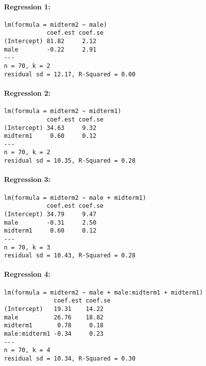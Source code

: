 \documentclass[addpoints,12pt]{exam}
\begin{document}
\begin{questions}
\begin{table}
\paragraph{Regression 1:}
\begin{verbatim}
lm(formula = midterm2 ~ male)
            coef.est coef.se
(Intercept) 81.82     2.12  
male        -0.22     2.91  
---
n = 70, k = 2
residual sd = 12.17, R-Squared = 0.00
	\end{verbatim}
	\paragraph{Regression 2:}
	\begin{verbatim}
lm(formula = midterm2 ~ midterm1)
            coef.est coef.se
(Intercept) 34.63     9.32  
midterm1     0.60     0.12  
---
n = 70, k = 2
residual sd = 10.35, R-Squared = 0.28
	\end{verbatim}
	\paragraph{Regression 3:}
	\begin{verbatim}
lm(formula = midterm2 ~ male + midterm1)
            coef.est coef.se
(Intercept) 34.79     9.47  
male        -0.31     2.50  
midterm1     0.60     0.12  
---
n = 70, k = 3
residual sd = 10.43, R-Squared = 0.28
	\end{verbatim}
	\paragraph{Regression 4:}
	\begin{verbatim}
lm(formula = midterm2 ~ male + male:midterm1 + midterm1)
              coef.est coef.se
(Intercept)   19.31    14.22  
male          26.76    18.82  
midterm1       0.78     0.18  
male:midterm1 -0.34     0.23  
---
n = 70, k = 4
residual sd = 10.34, R-Squared = 0.30
	\end{verbatim}
	\label{tab:reg}
\end{table}

\end{questions}
\end{document}
